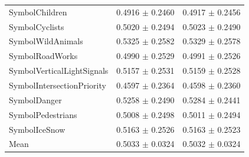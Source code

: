 \begin{longtable}{@{}lrr@{}}
SymbolChildren & 0.4916 $\pm$ 0.2460 & 0.4917 $\pm$ 0.2456 \\
SymbolCyclists & 0.5020 $\pm$ 0.2494 & 0.5023 $\pm$ 0.2490 \\
SymbolWildAnimals & 0.5325 $\pm$ 0.2582 & 0.5329 $\pm$ 0.2578 \\
SymbolRoadWorks & 0.4990 $\pm$ 0.2529 & 0.4991 $\pm$ 0.2526 \\
SymbolVerticalLightSignals & 0.5157 $\pm$ 0.2531 & 0.5159 $\pm$ 0.2528 \\
SymbolIntersectionPriority & 0.4597 $\pm$ 0.2364 & 0.4598 $\pm$ 0.2360 \\
SymbolDanger & 0.5258 $\pm$ 0.2490 & 0.5284 $\pm$ 0.2441 \\
SymbolPedestrians & 0.5008 $\pm$ 0.2498 & 0.5011 $\pm$ 0.2494 \\
SymbolIceSnow & 0.5163 $\pm$ 0.2526 & 0.5163 $\pm$ 0.2523 \\
Mean & 0.5033 $\pm$ 0.0324 & 0.5032 $\pm$ 0.0324 \\
\end{longtable}
